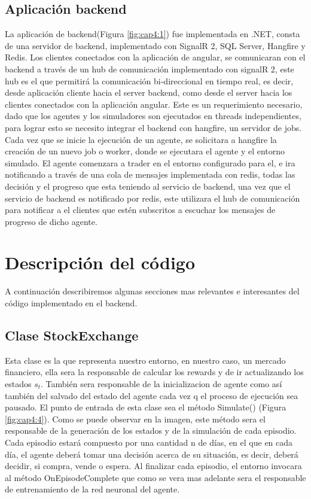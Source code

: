 \subsection{Aplicación backend}

La aplicación de backend(Figura \ref{fig:cap4:1}) fue implementada en .NET, consta de una servidor de backend, implementado con SignalR 2, SQL Server, Hangfire y Redis. 
Los clientes conectados con la aplicación de angular, se comunicaran con el backend a través de un hub de comunicación implementado con signalR 2, este hub es el que permitirá la comunicación bi-direccional en tiempo real, es decir, desde aplicación cliente hacia el server backend, como desde el server hacia los clientes conectados con la aplicación angular. Este es un requerimiento necesario, dado que los agentes y los simuladores son ejecutados en threads independientes, para lograr esto se necesito integrar el backend con hangfire, un servidor de jobs. 
Cada vez que se inicie la ejecución de un agente, se solicitara a hangfire la creación de un nuevo job o worker, donde se ejecutara el agente y el entorno simulado. El agente comenzara a trader en el entorno configurado para el, e ira notificando a través de una cola de mensajes implementada con redis, todas las decisión y el progreso que esta teniendo al servicio de backend, una vez que el servicio de backend es notificado por redis, este utilizara el hub de comunicación para notificar a el clientes que estén subscritos a escuchar los mensajes de progreso de dicho agente.

\section{Descripción del código}
A continuación describiremos algunas secciones mas relevantes e interesantes del código implementado en el backend.

\subsection{Clase StockExchange}

Esta clase es la que representa nuestro entorno, en nuestro caso, un mercado financiero, ella sera la responsable de calcular los rewards y de ir actualizando los estados $s_t$. También sera responsable de la inicializacion de agente como así también del salvado del estado del agente cada vez q el proceso de ejecución sea pausado. El punto de entrada de esta clase sea el método Simulate() (Figura \ref{fig:cap4:4}).
Como se puede observar en la imagen, este método sera el responsable de la generación de los estados y de la simulación de cada episodio. Cada episodio estará compuesto por una cantidad n de días, en el que en cada día, el agente
deberá tomar una decisión acerca de su situación, es decir, deberá decidir, si compra, vende o espera. Al finalizar cada episodio, el entorno invocara al método OnEpisodeComplete que como se vera mas adelante sera el responsable de entrenamiento de la red neuronal del agente.\\

